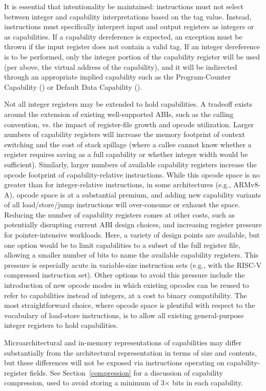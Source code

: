 It is essential that intentionality be maintained: instructions
must not select between integer and capability interpretations based on the
tag value.
Instead, instructions must specifically interpret input and output registers
as integers or as capabilities.
If a capability dereference is expected, an exception must be thrown if the
input register does not contain a valid tag.
If an integer dereference is to be performed, only the integer portion of the
capability register will be used (per above, the virtual address of the
capability), and it will be indirected through an appropriate implied
capability such as the Program-Counter Capability (\PCC{}) or Default Data
Capability (\DDC{}).

Not all
integer registers may be extended to hold capabilities.
A tradeoff exists around the extension of existing well-supported ABIs, such
as the calling convention, vs. the impact of register-file growth and opcode
utilization.
Larger numbers of capability registers will increase the memory footprint of
context switching and the cost of stack spillage (where a callee cannot know
whether a register requires saving as a full capability or whether integer
width would be sufficient).
Similarly, larger numbers of available capability registers increase the
opcode footprint of capability-relative instructions.
While this opcode space is no greater than for integer-relative instructions,
in some architectures (e.g., ARMv8-A), opcode space is at a substantial premium,
and adding new capability variants of all load/store/jump instructions will
over-consume or exhaust the space.
Reducing the number of capability registers comes at other costs, such as
potentially disrupting current ABI design choices, and increasing register
pressure for pointer-intensive workloads.
Here, a variety of design points are available, but one option would be to
limit capabilities to a subset of the full register file, allowing a smaller
number of bits to name the available capability registers.
This pressure is especially acute in variable-size instruction sets (e.g.,
with the RISC-V compressed instruction set).
Other options to avoid this pressure include the introduction of new opcode
modes in which existing opcodes can be reused to refer to capabilities instead
of integers, at a cost to binary compatibility.
The most straightforward choice, where opcode space is plentiful with respect
to the vocabulary of load-store instructions, is to allow all existing
general-purpose integer registers to hold capabilities.

Microarchitectural and in-memory representations of capabilities may differ
substantially from the architectural representation in terms of size and
contents, but these differences will not be exposed via instructions operating
on capability-register fields.
See Section~\ref{compression} for a discussion of capability compression,
used to avoid storing a minimum of 3$\times$ \xlen{} bits in each capability.

